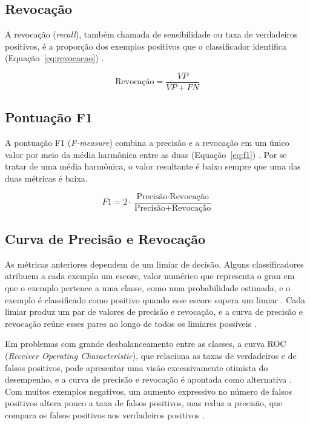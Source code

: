 \documentclass{uflamon}          %
\begin{document}
\subsection{Revocação}

A revocação (\textit{recall}), também chamada de sensibilidade ou taxa de verdadeiros positivos, é a proporção dos exemplos positivos que o classificador identifica (Equação~\ref{eq:revocacao}) \cite{fawcett2006}.

\begin{equation}
    \text{Revocação} = \frac{VP}{VP + FN}
    \label{eq:revocacao}
\end{equation}

\subsection{Pontuação F1}

A pontuação F1 (\textit{F-measure}) combina a precisão e a revocação em um único valor por meio da média harmônica entre as duas (Equação~\ref{eq:f1}) \cite{fawcett2006}. Por se tratar de uma média harmônica, o valor resultante é baixo sempre que uma das duas métricas é baixa.

\begin{equation}
    F1 = 2 \cdot \frac{\text{Precisão} \cdot \text{Revocação}}{\text{Precisão} + \text{Revocação}}
    \label{eq:f1}
\end{equation}

\subsection{Curva de Precisão e Revocação}

As métricas anteriores dependem de um limiar de decisão. Alguns classificadores atribuem a cada exemplo um escore, valor numérico que representa o grau em que o exemplo pertence a uma classe, como uma probabilidade estimada, e o exemplo é classificado como positivo quando esse escore supera um limiar \cite{fawcett2006}. Cada limiar produz um par de valores de precisão e revocação, e a curva de precisão e revocação reúne esses pares ao longo de todos os limiares possíveis \cite{davis2006}.

Em problemas com grande desbalanceamento entre as classes, a curva ROC (\textit{Receiver Operating Characteristic}), que relaciona as taxas de verdadeiros e de falsos positivos, pode apresentar uma visão excessivamente otimista do desempenho, e a curva de precisão e revocação é apontada como alternativa \cite{davis2006}. Com muitos exemplos negativos, um aumento expressivo no número de falsos positivos altera pouco a taxa de falsos positivos, mas reduz a precisão, que compara os falsos positivos aos verdadeiros positivos \cite{davis2006}.
\end{document}
